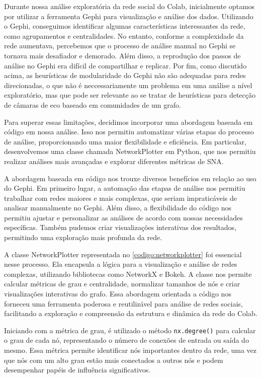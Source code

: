 Durante nossa análise exploratória da rede social do Colab, inicialmente optamos por utilizar a ferramenta Gephi para visualização e análise dos dados. Utilizando o Gephi, conseguimos identificar algumas características interessantes da rede, como agrupamentos e centralidades. No entanto, conforme a complexidade da rede aumentava, percebemos que o processo de análise manual no Gephi se tornava mais desafiador e demorado. Além disso, a reprodução dos passos de análise no Gephi era difícil de compartilhar e replicar. Por fim, como discutido acima, as heurísticas de modularidade do Gephi não são adequadas para redes direcionadas, o que não é neccessariamente um problema em uma análise a nível exploratório, mas que pode ser relevante ao se tratar de heurísticas para detecção de câmaras de eco baseado em comunidades de um grafo.

Para superar essas limitações, decidimos incorporar uma abordagem baseada em código em nossa análise. Isso nos permitiu automatizar várias etapas do processo de análise, proporcionando uma maior flexibilidade e eficiência. Em particular, desenvolvemos uma classe chamada NetworkPlotter em Python, que nos permitiu realizar análises mais avançadas e explorar diferentes métricas de SNA.

A abordagem baseada em código nos trouxe diversos benefícios em relação ao uso do Gephi. Em primeiro lugar, a automação das etapas de análise nos permitiu trabalhar com redes maiores e mais complexas, que seriam impraticáveis de analisar manualmente no Gephi. Além disso, a flexibilidade do código nos permitiu ajustar e personalizar as análises de acordo com nossas necessidades específicas. Também pudemos criar visualizações interativas dos resultados, permitindo uma exploração mais profunda da rede.

A classe NetworkPlotter representada no \autoref{codigo:networkplotter} foi essencial nesse processo. Ela encapsula a lógica para a visualização e análise de redes complexas, utilizando bibliotecas como NetworkX e Bokeh. A classe nos permite calcular métricas de grau e centralidade, normalizar tamanhos de nós e criar visualizações interativas do grafo. Essa abordagem orientada a código nos forneceu uma ferramenta poderosa e reutilizável para análise de redes sociais, facilitando a exploração e compreensão da estrutura e dinâmica da rede do Colab.

Iniciando com a métrica de grau, é utilizado o método \texttt{nx.degree()} para calcular o grau de cada nó, representando o número de conexões de entrada ou saída do mesmo. Essa métrica permite identificar nós importantes dentro da rede, uma vez que nós com um alto grau estão mais conectados a outros nós e podem desempenhar papéis de influência significativos.

